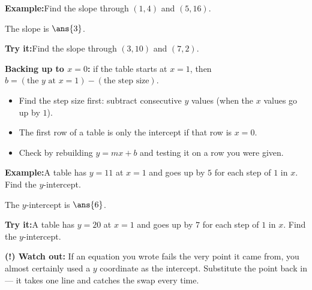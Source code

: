 \documentclass[12pt]{article}
\begin{document}
\begin{examplebox}
\textbf{Example:}\quad Find the slope through $(1, 4)$ and $(5, 16)$.

The slope is $\ans{3}$.
\end{examplebox}

\begin{tryitbox}
\textbf{Try it:}\quad Find the slope through $(3, 10)$ and $(7, 2)$.\\[2pt]
\end{tryitbox}


\begin{formulabox}
\textbf{Backing up to $x = 0$:} if the table starts at $x = 1$, then
$b = (\text{the } y \text{ at } x = 1) - (\text{the step size})$.
\begin{itemize}[leftmargin=0.8cm, itemsep=1pt, topsep=2pt]
  \item Find the step size first: subtract consecutive $y$ values (when the $x$
        values go up by $1$).
  \item The first row of a table is only the intercept if that row is $x = 0$.
  \item Check by rebuilding $y = mx + b$ and testing it on a row you were given.
\end{itemize}
\end{formulabox}

\begin{examplebox}
\textbf{Example:}\quad A table has $y = 11$ at $x = 1$ and goes up by $5$ for
each step of $1$ in $x$. Find the $y$-intercept.

The $y$-intercept is $\ans{6}$.
\end{examplebox}

\begin{tryitbox}
\textbf{Try it:}\quad A table has $y = 20$ at $x = 1$ and goes up by $7$ for each
step of $1$ in $x$. Find the $y$-intercept.\\[2pt]
\end{tryitbox}

\begin{watchoutbox}
\textbf{(!) Watch out:} If an equation you wrote fails the very point it came
from, you almost certainly used a $y$ coordinate as the intercept. Substitute the
point back in --- it takes one line and catches the swap every time.
\end{watchoutbox}
\end{document}
